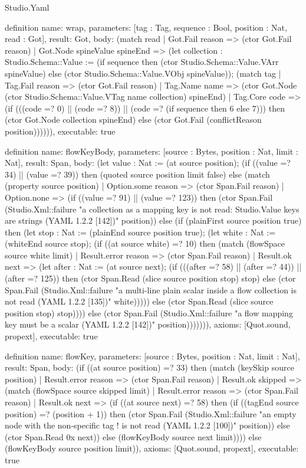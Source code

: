 \begin{lexlean}{Studio.Yaml}
\begin{semanticmodule}
definition{
  name: wrap,
  parameters: [tag : Tag, sequence : Bool, position : Nat, read : Got],
  result: Got,
  body: (match read
    | Got.Fail reason => (ctor Got.Fail reason)
    | Got.Node spineValue spineEnd => (let collection : Studio.Schema::Value := (if sequence then (ctor Studio.Schema::Value.VArr spineValue) else (ctor Studio.Schema::Value.VObj spineValue)); (match tag
      | Tag.Fail reason => (ctor Got.Fail reason)
      | Tag.Name name => (ctor Got.Node (ctor Studio.Schema::Value.VTag name collection) spineEnd)
      | Tag.Core code => (if (((code =? 0) || (code =? 8)) || (code =? (if sequence then 6 else 7))) then (ctor Got.Node collection spineEnd) else (ctor Got.Fail (conflictReason position)))))),
  executable: true
}

definition{
  name: flowKeyBody,
  parameters: [source : Bytes, position : Nat, limit : Nat],
  result: Span,
  body: (let value : Nat := (at source position); (if ((value =? 34) || (value =? 39)) then (quoted source position limit false) else (match (property source position)
    | Option.some reason => (ctor Span.Fail reason)
    | Option.none => (if ((value =? 91) || (value =? 123)) then (ctor Span.Fail (Studio.Xml::failure "a collection as a mapping key is not read: Studio.Value keys are strings (YAML 1.2.2 [142])" position)) else (if (plainFirst source position true) then (let stop : Nat := (plainEnd source position true); (let white : Nat := (whiteEnd source stop); (if ((at source white) =? 10) then (match (flowSpace source white limit)
      | Result.error reason => (ctor Span.Fail reason)
      | Result.ok next => (let after : Nat := (at source next); (if (((after =? 58) || (after =? 44)) || (after =? 125)) then (ctor Span.Read (slice source position stop) stop) else (ctor Span.Fail (Studio.Xml::failure "a multi-line plain scalar inside a flow collection is not read (YAML 1.2.2 [135])" white))))) else (ctor Span.Read (slice source position stop) stop)))) else (ctor Span.Fail (Studio.Xml::failure "a flow mapping key must be a scalar (YAML 1.2.2 [142])" position))))))),
  axioms: [Quot.sound, propext],
  executable: true
}

definition{
  name: flowKey,
  parameters: [source : Bytes, position : Nat, limit : Nat],
  result: Span,
  body: (if ((at source position) =? 33) then (match (keySkip source position)
    | Result.error reason => (ctor Span.Fail reason)
    | Result.ok skipped => (match (flowSpace source skipped limit)
      | Result.error reason => (ctor Span.Fail reason)
      | Result.ok next => (if ((at source next) =? 58) then (if ((tagEnd source position) =? (position + 1)) then (ctor Span.Fail (Studio.Xml::failure "an empty node with the non-specific tag ! is not read (YAML 1.2.2 [100])" position)) else (ctor Span.Read 0x next)) else (flowKeyBody source next limit)))) else (flowKeyBody source position limit)),
  axioms: [Quot.sound, propext],
  executable: true
}


\end{semanticmodule}
\end{lexlean}
